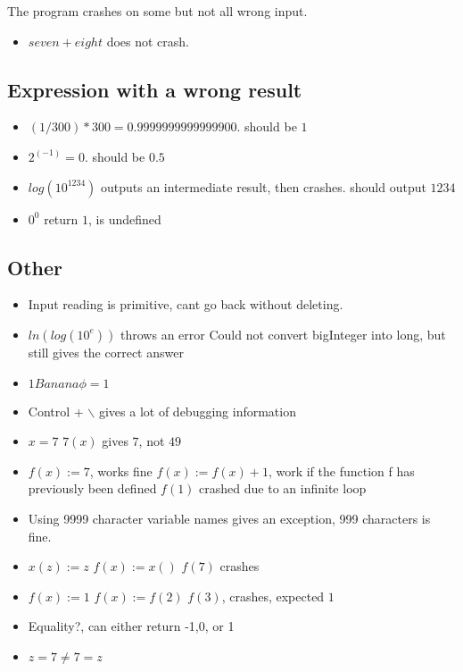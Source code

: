 \documentclass[11pt,a4paper]{article}
\begin{document}
The program crashes on some but not all wrong input.
\begin{itemize}
\item \(seven + eight\) does not crash.
\end{itemize}
\subsection{Expression with a wrong result}
\label{sec:orgheadline28}
\begin{itemize}
\item \((1 / 300) * 300 = 0.9999999999999900\). should be \(1\)
\item \(2^(-1) = 0\). should be \(0.5\)
\item \(log( 10 ^ 1234)\) outputs an intermediate result, then crashes. should output \(1234\)
\item \(0^0\) return \(1\), is undefined
\end{itemize}

\subsection{Other}
\label{sec:orgheadline29}
\begin{itemize}
\item Input reading is primitive, cant go back without deleting.
\item \(ln(log( 10^e ))\) throws an error Could not convert bigInteger into long, but still gives the correct answer
\item \(1 Banana \phi = 1\)
\item Control + $\backslash$ gives a lot of debugging information
\item \(x=7\)
      \(7(x)\) gives \(7\), not \(49\)
\item \(f(x):=7\), works fine
\(f(x):=f(x)+1\), work if the function f has previously been defined
\(f(1)\) crashed due to an infinite loop
\item Using 9999 character variable names gives an exception, 999 characters is fine.
\item \(x(z):=z\)
      \(f(x):=x()\)
      \(f(7)\)
      crashes
\item \(f(x):=1\)
      \(f(x):=f(2)\)
      \(f(3)\), crashes, expected \(1\)
\item Equality?, can either return -1,0, or 1
\item \(z=7 \ne 7=z\)
\end{itemize}
\end{document}
